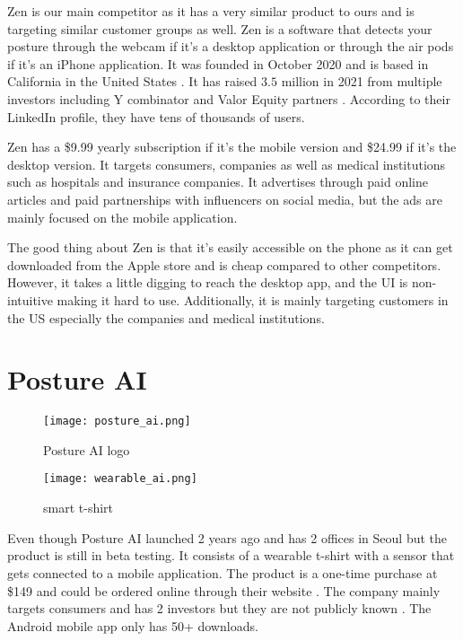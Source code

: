 Zen is our main competitor as it has a very similar product to ours and is targeting similar customer groups as well. Zen is a software that detects your posture through the webcam if it's a desktop application or through the air pods if it's an iPhone application.  It was founded in October 2020 and is based in California in the United States \cite{zen_crunchbase}. It has raised $3.5$ million in 2021 from multiple investors including Y combinator\cite{posturehealth_ycombinator} and Valor Equity partners \cite{zen_techcrunch}. According to their LinkedIn\cite{posturehealth_linkedin} profile, they have tens of thousands of users. 

Zen has a \$9.99 yearly subscription if it's the mobile version and \$24.99 if it's the desktop version. It targets consumers, companies as well as medical institutions such as hospitals and insurance companies. It advertises through paid online articles and paid partnerships with influencers on social media, but the ads are mainly focused on the mobile application.

The good thing about Zen is that it's easily accessible on the phone as it can get downloaded from the Apple store and is cheap compared to other competitors. However, it takes a little digging to reach the desktop app, and the UI is non-intuitive making it hard to use. Additionally, it is mainly targeting customers in the US especially the companies and medical institutions.

\section{Posture AI}
\begin{figure}[H]
    \centering
    \texttt{[image: posture\_ai.png]}
    \caption{Posture AI logo}
    \label{fig:posture_ai}
\end{figure}

\begin{figure}[H]
    \centering
    \texttt{[image: wearable\_ai.png]}
    \caption{smart t-shirt}
    \label{fig:wearable_ai}
\end{figure}
Even though Posture AI launched 2 years ago and has 2 offices in Seoul \cite{postureai_linkedin} but the product is still in beta testing. It consists of a wearable t-shirt with a sensor that gets connected to a mobile application. The product is a one-time purchase at \$149 and could be ordered online through their website \cite{myposture}. The company mainly targets consumers and has 2 investors but they are not publicly known \cite{postureai_pitchbook}. The Android mobile app only has 50+ downloads. 

